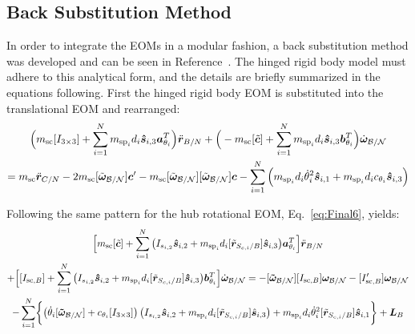 \subsection{Back Substitution Method}

In order to integrate the EOMs in a modular fashion, a back substitution method was developed and can be seen in Reference~\cite{Allard2016rz}. The hinged rigid body model must adhere to this analytical form, and the details are briefly summarized in the equations following. First the hinged rigid body EOM is substituted into the translational EOM and rearranged:
\begin{multline}
\Big(m_{\text{sc}} [I_{3\times3}] +\sum_{i=1}^{N}m_{\text{sp}_i}d_i \bm{\hat{s}}_{i,3} \bm a_{\theta_i}^T\Big)\ddot{\bm r}_{B/N}+\Big(-m_{\text{sc}} [\tilde{\bm{c}}] +\sum_{i=1}^{N}m_{\text{sp}_i}d_i \bm{\hat{s}}_{i,3} \bm b_{\theta_i}^T\Big) \dot{\bm\omega}_{\cal B/N} \\
= m_{\text{sc}} \ddot{\bm r}_{C/N} 	- 2 m_{\text{sc}} [\tilde{\bm\omega}_{\cal B/N}] \bm c'
-m_{\text{sc}} [\tilde{\bm\omega}_{\cal B/N}][\tilde{\bm\omega}_{\cal B/N}]\bm{c}
-\sum_{i=1}^{N}\Big(m_{\text{sp}_i}d_i \dot{\theta}_i^2 \bm{\hat{s}}_{i,1}+m_{\text{sp}_i}d_i c_{\theta_i} \bm{\hat{s}}_{i,3} \Big)
\label{eq:Rbddot8}
\end{multline}

Following the same pattern for the hub rotational EOM, Eq.~\eqref{eq:Final6}, yields:
\begin{multline}
\Big[m_{\text{sc}}[\tilde{\bm{c}}] +\sum\limits_{i=1}^{N}\big( I_{s_{i,2}}\bm{\hat{s}}_{i,2}+m_{\text{sp}_i}d_i [\tilde{\bm{r}}_{S_{c,i}/B}] \bm{\hat{s}}_{i,3}\big)\bm a_{\theta_i}^T \Big]\ddot{\bm r}_{B/N}\\
+\Big[[I_{\text{sc},B}]+\sum\limits_{i=1}^{N}\big( I_{s_{i,2}}\bm{\hat{s}}_{i,2}+m_{\text{sp}_i}d_i [\tilde{\bm{r}}_{S_{c,i}/B}] \bm{\hat{s}}_{i,3}\big) \bm b_{\theta_i}^T\Big] \dot{\bm\omega}_{\cal B/N}
= 
-[\bm{\tilde{\omega}}_{\cal B/N}] [I_{\text{sc},B}] \bm\omega_{\cal B/N} 
- [I'_{\text{sc},B}] \bm\omega_{\cal B/N} \\
-\sum\limits_{i=1}^{N}\biggl\lbrace\big(\dot{\theta}_i [\bm{\tilde{\omega}}_{\cal B/N}] +c_{\theta_i} [I_{3\times3}]\big) \left(I_{s_{i,2}} \bm{\hat{s}}_{i,2}+m_{\text{sp}_i} d_i [\tilde{\bm{r}}_{S_{c,i}/B}] \hat{\bm s}_{i,3}\right) +m_{\text{sp}_i}d_i\dot{\theta}_i^2[\tilde{\bm{r}}_{S_{c,i}/B}] \bm{\hat{s}}_{i,1} \biggr\rbrace + \bm{L}_B
\label{eq:Final9}
\end{multline}	

